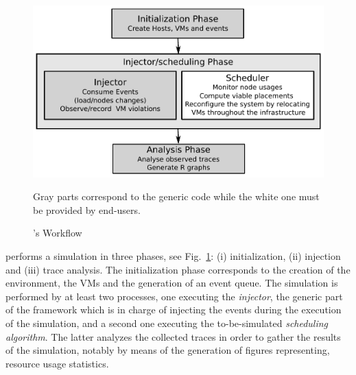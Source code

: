 \begin{figure}
\centering
\vspace*{-.8cm}
\includegraphics[width=.99\linewidth]{figures/VMPlaceS-workflow.pdf}
\vspace*{-.8cm}
\caption{\vmps's Workflow}
\vspace*{-.3cm}
\flushleft \scriptsize{Gray parts correspond to the generic code while the white one
  must be provided by end-users. %
}
\vspace*{-.7cm}
\label{fig:workflow}
\end{figure}
%
\vmps performs a simulation in three phases, see
Fig.~\ref{fig:workflow}: (i) initialization, (ii) injection and (iii)
trace analysis.  The initialization phase corresponds to the creation
of the environment, the VMs and the generation of an event queue.
%
The simulation is performed by at least two \sg processes, one
executing the \emph{injector}, the generic part of the framework which
is in charge of injecting the events during the execution of the
simulation, and a second one executing the to-be-simulated
\emph{scheduling algorithm}.
%
The latter analyzes the collected traces in order to gather the
results of the simulation, notably by means of the generation of
figures representing, \eg resource usage statistics.

